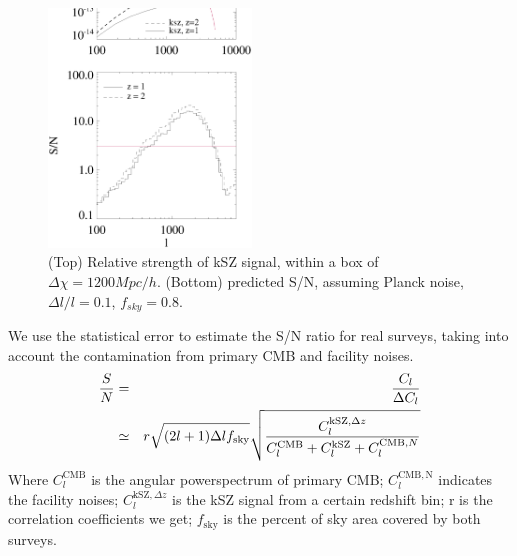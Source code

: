 \begin{figure}[tbp]
\begin{center}
\includegraphics[width=0.48\textwidth]{Cl_rsd_sn_z1z2.eps}
\end{center}
\vspace{-0.7cm}
\caption{(Top) Relative strength of kSZ signal, within a box of $\Delta \chi=1200 Mpc/h$. 
    (Bottom) predicted S/N, assuming Planck noise, $\Delta l/l=0.1$, $f_{sky}=0.8$. 
}
\label{fig:sn}
\end{figure}
We use the statistical error to estimate the S/N ratio for real surveys, 
taking into account the contamination from primary CMB and facility noises.
\begin{eqnarray}
    \frac{S}{N}&=&\frac{C_l}{\Delta C_l}\\\nonumber
               &\simeq&
    r\sqrt{(2l+1)\Delta l f_\mathrm{sky}}\sqrt{\frac{C_l^{\mathrm{kSZ},\Delta z}}{C_l^{\mathrm{CMB}}+C_l^\mathrm{kSZ}+C_l^{\mathrm{CMB},N}}}
\end{eqnarray}
Where $C_l^\mathrm{CMB}$ is the angular powerspectrum of primary CMB; 
$C_l^\mathrm{CMB,N}$ indicates the facility noises; 
$C_l^{\mathrm{kSZ},\Delta z}$ is the kSZ signal from a certain redshift bin; 
r is the correlation coefficients we get; 
$f_\mathrm{sky}$ is the percent of sky area covered by both surveys.

